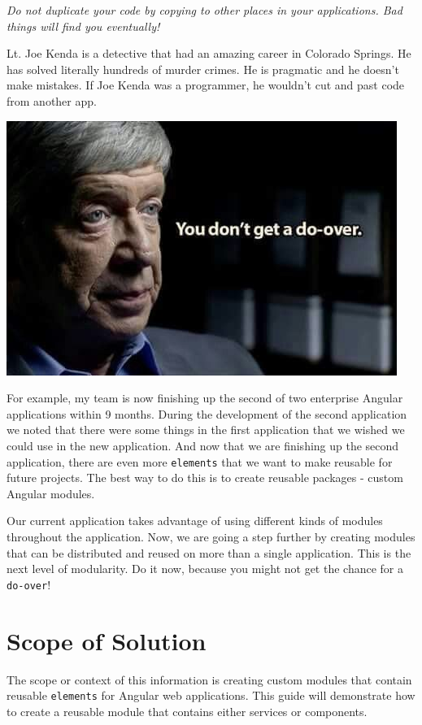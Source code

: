 \documentclass[]{book}
\theoremstyle{definition}
\theoremstyle{definition}
\theoremstyle{definition}
\theoremstyle{remark}
\begin{document}
\emph{Do not duplicate your code by copying to other places in your
applications. Bad things will find you eventually!}

Lt. Joe Kenda is a detective that had an amazing career in Colorado
Springs. He has solved literally hundreds of murder crimes. He is
pragmatic and he doesn't make mistakes. If Joe Kenda was a programmer,
he wouldn't cut and past code from another app.

\href{https://www.youtube.com/results?search_query=joe+kenda}{\includegraphics{images/you-dont-get-a-do-over.jpg}}

For example, my team is now finishing up the second of two enterprise
Angular applications within 9 months. During the development of the
second application we noted that there were some things in the first
application that we wished we could use in the new application. And now
that we are finishing up the second application, there are even more
\texttt{elements} that we want to make reusable for future projects. The
best way to do this is to create reusable packages - custom Angular
modules.

Our current application takes advantage of using different kinds of
modules throughout the application. Now, we are going a step further by
creating modules that can be distributed and reused on more than a
single application. This is the next level of modularity. Do it now,
because you might not get the chance for a \texttt{do-over}!

\chapter{Scope of Solution}\label{scope-of-solution}

The scope or context of this information is creating custom modules that
contain reusable \texttt{elements} for Angular web applications. This
guide will demonstrate how to create a reusable module that contains
either services or components.
\end{document}
